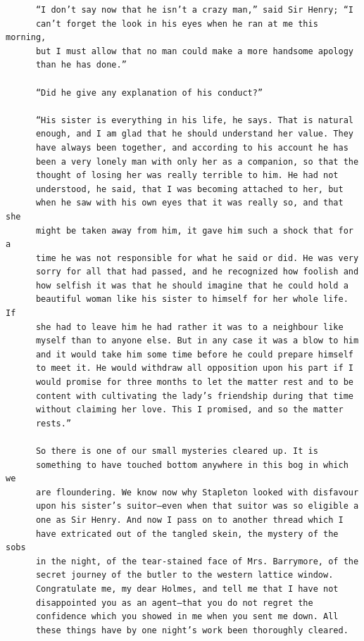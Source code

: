 \documentclass{article}
\begin{document}
\begin{verbatim}
      “I don’t say now that he isn’t a crazy man,” said Sir Henry; “I
      can’t forget the look in his eyes when he ran at me this morning,
      but I must allow that no man could make a more handsome apology
      than he has done.”

      “Did he give any explanation of his conduct?”

      “His sister is everything in his life, he says. That is natural
      enough, and I am glad that he should understand her value. They
      have always been together, and according to his account he has
      been a very lonely man with only her as a companion, so that the
      thought of losing her was really terrible to him. He had not
      understood, he said, that I was becoming attached to her, but
      when he saw with his own eyes that it was really so, and that she
      might be taken away from him, it gave him such a shock that for a
      time he was not responsible for what he said or did. He was very
      sorry for all that had passed, and he recognized how foolish and
      how selfish it was that he should imagine that he could hold a
      beautiful woman like his sister to himself for her whole life. If
      she had to leave him he had rather it was to a neighbour like
      myself than to anyone else. But in any case it was a blow to him
      and it would take him some time before he could prepare himself
      to meet it. He would withdraw all opposition upon his part if I
      would promise for three months to let the matter rest and to be
      content with cultivating the lady’s friendship during that time
      without claiming her love. This I promised, and so the matter
      rests.”

      So there is one of our small mysteries cleared up. It is
      something to have touched bottom anywhere in this bog in which we
      are floundering. We know now why Stapleton looked with disfavour
      upon his sister’s suitor—even when that suitor was so eligible a
      one as Sir Henry. And now I pass on to another thread which I
      have extricated out of the tangled skein, the mystery of the sobs
      in the night, of the tear-stained face of Mrs. Barrymore, of the
      secret journey of the butler to the western lattice window.
      Congratulate me, my dear Holmes, and tell me that I have not
      disappointed you as an agent—that you do not regret the
      confidence which you showed in me when you sent me down. All
      these things have by one night’s work been thoroughly cleared.


\end{verbatim}
\end{document}
